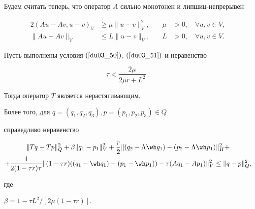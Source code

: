Будем считать теперь, что оператор $A$ сильно монотонен и липшиц-непрерывен 


\begin{alignat}{2}


({A u-A v , u-v})_V &\geq 


\mu \| {u-v} \|_V^2, &\quad \mu &> 0, 


\quad \forall u , v \in V,\label{du03_50} \\


%


 \| A u-A v \|_V &\leq L \| {u-v} \|_V, &\quad L &> 0, 


\quad \forall u , v \in V.


\label{du03_51}


\end{alignat}








\begin{thm} \label{bz_T6}


Пусть выполнены условия $(\ref{du03_50})$, $(\ref{du03_51})$ и неравенство


\begin{equation}


\tau < \frac {2 \mu} {2 \mu r +L^2} \; . 


\label{du03_52}


\end{equation}


Тогда оператор $T$ является нерастягивающим. 


Более того, для $q=(q_1, q_2, q_3) , p=(p_1, p_2, p_3) \in Q$ 


справедливо неравенство


\begin{multline}


\| {T q-T p} \|_Q^2 +


\beta \| q_1-p_1 \|_V^2+\frac {r} {2} 


 \| (q_2-\Lambda \wh q_1) -(p_2-\Lambda \wh p_1) \|_H^2+\\


%


+\frac {1}{2 (1-\tau r) \tau} \| (1-\tau r) ((q_1 -\wh q_1)- (p_1- \wh p_1))


- \tau (A q_1- A p_1) \|_V^2


\leq \| {q-p} \|_Q^2 ,


\label{du03_53}


\end{multline}


где 


$\beta=1- \tau L^2 / [2 \mu (1-\tau r)] $.


\end{thm}








